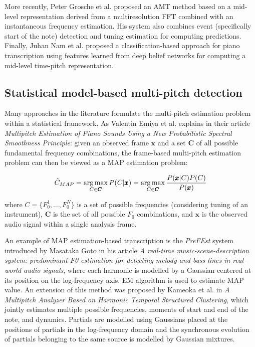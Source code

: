 More recently, Peter Grosche et al. proposed\cite{grosche2012automatic} an \ac{AMT} method based on a mid-level
representation derived from a multiresolution \ac{FFT} combined with an instantaneous frequency estimation. His system
also combines event (specifically start of the note) detection and tuning estimation for computing predictions. Finally,
Juhan Nam et al. proposed\cite{nam2011classification} a classification-based approach for piano transcription using
features learned from deep belief networks\cite{humphrey2013feature} for computing a mid-level time-pitch representation.

\subsection{Statistical model-based multi-pitch detection}\label{subsec:statistical-model-based-multi-pitch-detection}
Many approaches in the literature formulate the multi-pitch estimation problem within a statistical framework. As
Valentin Emiya et al. explains in their article \textit{Multipitch Estimation of Piano Sounds Using a New Probabilistic
Spectral Smoothness Principle}\cite{proba-spectral-smoothness}: given an observed frame $\pmb{x}$ and a set $\pmb{C}$ of
all possible fundamental frequency combinations, the frame-based multi-pitch estimation problem can then be viewed as
a \ac{MAP} estimation problem:

\[ \hat{C}_{MAP} = \operatorname*{arg\,max}_{C \in \pmb{C}} P(C|\pmb{x}) = \operatorname*{arg\,max}_{C \in \pmb{C}} \frac{P(\pmb{x}|C)P(C)}{P(\pmb{x})} \]

where $C = \{F_0^1, \dots, F_0^N\}$ is a set of possible frequencies (considering tuning of an instrument), $\pmb{C}$ is
the set of all possible $F_0$ combinations, and $\pmb{x}$ is the observed audio signal within a single analysis frame.

An example of \ac{MAP} estimation-based transcription is the \textit{PreFEst} system introduced by Masataka Goto in his
article \textit{A real-time music-scene-description system: predominant-F0 estimation for detecting melody and bass
lines in real-world audio signals}\cite{predominant-f0-estimation}, where each harmonic is modelled by a Gaussian
centered at its position on the log-frequency axis. \ac{EM} algorithm is used to estimate \ac{MAP} value.
An extension of this method was proposed by Kameoka et al. in \textit{A Multipitch Analyzer Based on Harmonic Temporal
Structured Clustering}\cite{harmonic-temporal-structured-clustering}, which jointly estimates multiple possible
frequencies, moments of start and end of the note, and dynamics. Partials are modelled using Gaussians placed at
the positions of partials in the log-frequency domain and the synchronous evolution of partials belonging to the same
source is modelled by Gaussian mixtures.

